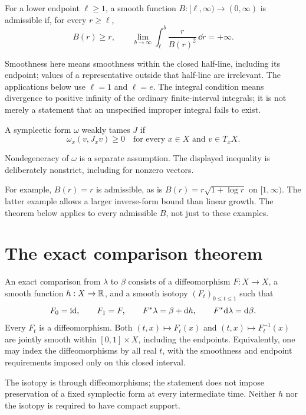 \begin{definition}\label{def:growth}
For a lower endpoint $\ell\ge1$, a smooth function
$B:[\ell,\infty)\to(0,\infty)$ is admissible if, for every $r\ge\ell$,
\begin{equation}\label{eq:admissible}
 B(r)\ge r,\qquad
 \lim_{b\to\infty}\int_\ell^b\frac{r}{B(r)^2}\,\dd r=+\infty .
\end{equation}
\end{definition}
Smoothness here means smoothness within the closed half-line, including
its endpoint; values of a representative outside that half-line are
irrelevant. The applications below use $\ell=1$ and $\ell=e$.
The integral condition means divergence to positive infinity of the
ordinary finite-interval integrals; it is not merely a statement
that an unspecified improper integral fails to exist.

\begin{definition}\label{def:weak}
A symplectic form $\omega$ weakly tames $J$ if
\[
 \omega_x(v,J_xv)\ge0
 \quad\text{for every }x\in X\text{ and }v\in T_xX.
\]
\end{definition}
Nondegeneracy of $\omega$ is a separate assumption. The displayed
inequality is deliberately nonstrict, including for nonzero vectors.

For example, $B(r)=r$ is admissible, as is
$B(r)=r\sqrt{1+\log r}$ on $[1,\infty)$.
The latter example allows a larger inverse-form bound than linear
growth. The theorem below applies to every admissible $B$, not just
to these examples.

\section{The exact comparison theorem}
\begin{definition}\label{def:comparison}
An exact comparison from $\lambda$ to $\beta$ consists of a
diffeomorphism $F:X\to X$, a smooth function $h:X\to\mathbb R$, and a smooth
isotopy $(F_t)_{0\le t\le1}$ such that
\[
 F_0=\mathrm{id},\qquad F_1=F,\qquad
 F^*\lambda=\beta+\mathrm d h,\qquad F^*\mathrm d\lambda=\mathrm d\beta .
\]
Every $F_t$ is a diffeomorphism. Both $(t,x)\mapsto F_t(x)$
and $(t,x)\mapsto F_t^{-1}(x)$ are jointly smooth within
$[0,1]\times X$, including the endpoints. Equivalently, one may
index the diffeomorphisms by all real $t$, with the smoothness and
endpoint requirements imposed only on this closed interval.
\end{definition}
The isotopy is through diffeomorphisms; the statement does not impose
preservation of a fixed symplectic form at every intermediate time.
Neither $h$ nor the isotopy is required to have compact support.

